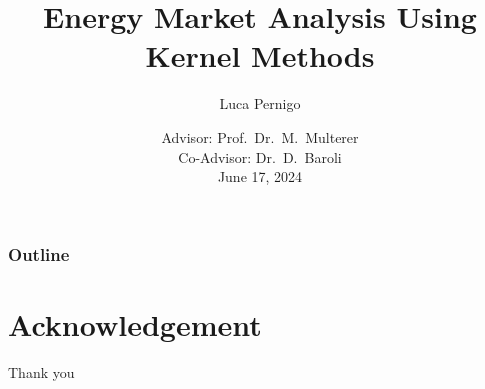 \documentclass[10pt]{beamer}
\title[USI]{Energy Market Analysis Using Kernel Methods}%
\author[Luca Pernigo]{Luca Pernigo}%
\institute[USI]{Università della Svizzera italiana\inst{1}}
\date[\textcolor{white}{Energy Market Analysis KernelMethods, 2024}]
{Advisor: Prof.\ Dr.\ M.\ Multerer\\
Co-Advisor: Dr.\ D.\ Baroli\\
June 17, 2024}
\begin{document}
\frame{\titlepage}
\begin{frame}
\frametitle{Outline}
\tableofcontents
\end{frame}



\section*{Acknowledgement}  
\begin{frame}

\textcolor{myNewColorA}{\huge{\centerline{Thank you}}}
\vspace*{0.5cm}


\end{frame}
\end{document}
